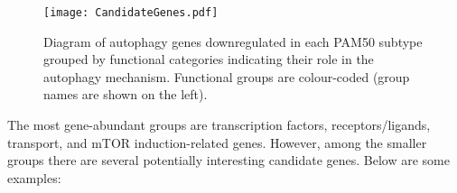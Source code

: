             \begin{figure}[!h]
            \centering
            \texttt{[image: CandidateGenes.pdf]} 
            \caption[Candidate genes lists]{Diagram of autophagy genes downregulated in each PAM50 subtype grouped by functional categories indicating their role in the autophagy mechanism. Functional groups are colour-coded (group names are shown on the left). }
            \label{fig:candidategenes}
            \end{figure}
            
\newpage
The most gene-abundant groups are transcription factors, receptors/ligands, transport, and mTOR induction-related genes. However, among the smaller groups there are several potentially interesting candidate genes. Below are some examples: 

